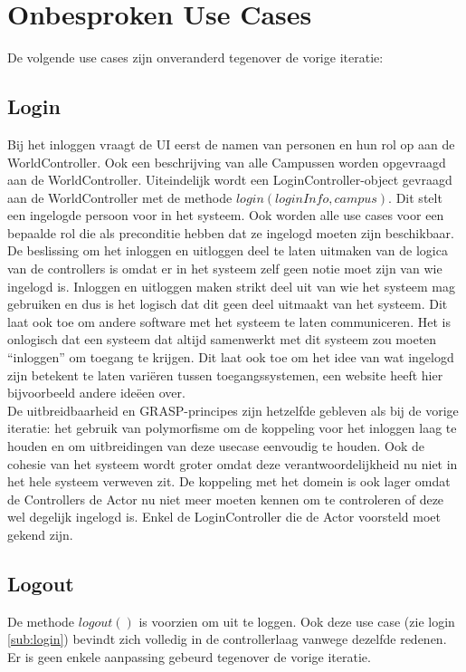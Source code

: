 \section{Onbesproken Use Cases\label{rest}}
De volgende use cases zijn onveranderd tegenover de vorige iteratie:

\subsection{Login\label{sub:login}}
Bij het inloggen vraagt de UI eerst de namen van personen en hun rol op aan de WorldController. 
Ook een beschrijving van alle Campussen worden opgevraagd aan de WorldController. 
Uiteindelijk wordt een LoginController-object gevraagd aan de WorldController met de methode $login(loginInfo, campus)$. 
Dit stelt een ingelogde persoon voor in het systeem. 
Ook worden alle use cases voor een bepaalde rol die als preconditie hebben dat ze ingelogd moeten zijn beschikbaar.\\

De beslissing om het inloggen en uitloggen deel te laten uitmaken van de logica van de controllers is omdat er in het systeem zelf geen notie moet zijn van wie ingelogd is.
Inloggen en uitloggen maken strikt deel uit van wie het systeem mag gebruiken en dus is het logisch dat dit geen deel uitmaakt van het systeem. 
Dit laat ook toe om andere software met het systeem te laten communiceren. 
Het is onlogisch dat een systeem dat altijd samenwerkt met dit systeem zou moeten ``inloggen'' om toegang te krijgen.
Dit laat ook toe om het idee van wat ingelogd zijn betekent te laten variëren tussen toegangssystemen, een website heeft hier bijvoorbeeld andere ideëen over. \\

De uitbreidbaarheid en GRASP-principes zijn hetzelfde gebleven als bij de vorige iteratie:
het gebruik van polymorfisme om de koppeling voor het inloggen laag te houden en om uitbreidingen van deze usecase eenvoudig te houden. 
Ook de cohesie van het systeem wordt groter omdat deze verantwoordelijkheid nu niet in het hele systeem verweven zit. 
De koppeling met het domein is ook lager omdat de Controllers de Actor nu niet meer moeten kennen om te controleren of deze wel degelijk ingelogd is. 
Enkel de LoginController die de Actor voorsteld moet gekend zijn.

\subsection{Logout}
De methode $logout()$ is voorzien om uit te loggen. Ook deze use case (zie login \ref{sub:login}) bevindt zich volledig in de controllerlaag vanwege dezelfde redenen.
Er is geen enkele aanpassing gebeurd tegenover de vorige iteratie.


